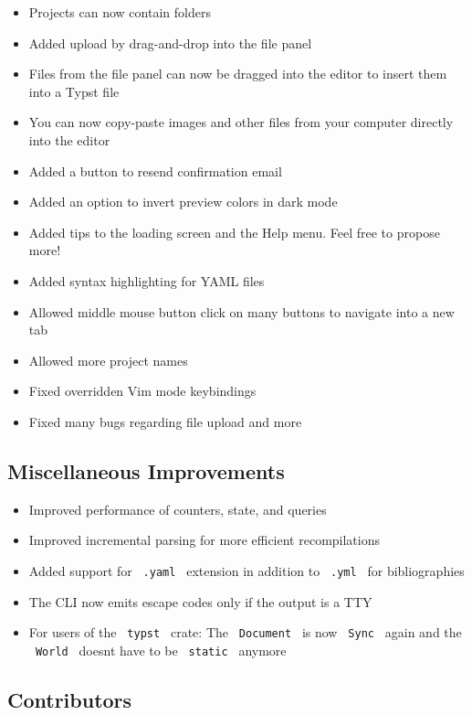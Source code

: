 \begin{itemize}
\tightlist
\item
  Projects can now contain folders
\item
  Added upload by drag-and-drop into the file panel
\item
  Files from the file panel can now be dragged into the editor to insert
  them into a Typst file
\item
  You can now copy-paste images and other files from your computer
  directly into the editor
\item
  Added a button to resend confirmation email
\item
  Added an option to invert preview colors in dark mode
\item
  Added tips to the loading screen and the Help menu. Feel free to
  propose more!
\item
  Added syntax highlighting for YAML files
\item
  Allowed middle mouse button click on many buttons to navigate into a
  new tab
\item
  Allowed more project names
\item
  Fixed overridden Vim mode keybindings
\item
  Fixed many bugs regarding file upload and more
\end{itemize}

\subsection{Miscellaneous
Improvements}\label{miscellaneous-improvements}

\begin{itemize}
\tightlist
\item
  Improved performance of counters, state, and queries
\item
  Improved incremental parsing for more efficient recompilations
\item
  Added support for \texttt{\ .yaml\ } extension in addition to
  \texttt{\ .yml\ } for bibliographies
\item
  The CLI now emits escape codes only if the output is a TTY
\item
  For users of the \texttt{\ typst\ } crate: The \texttt{\ Document\ }
  is now \texttt{\ Sync\ } again and the \texttt{\ World\ }
  doesn\textquotesingle t have to be
  \texttt{\ \textquotesingle{}static\ } anymore
\end{itemize}

\subsection{Contributors}\label{contributors}

